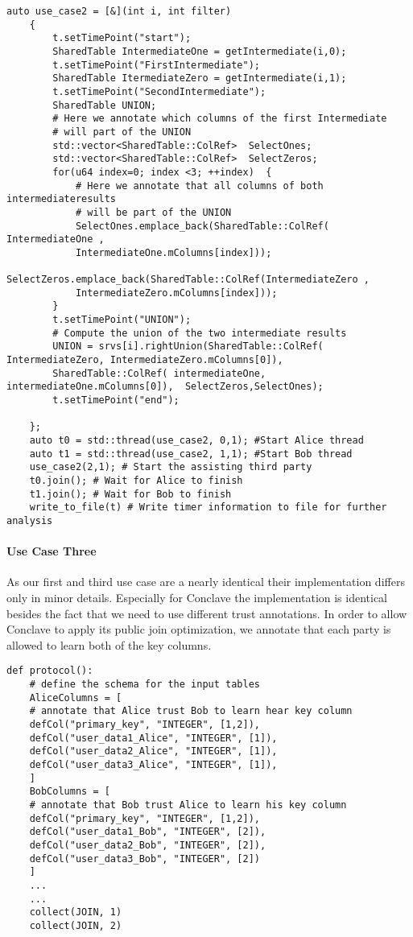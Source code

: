 \label{Listing 5.7}   
\begin{lstlisting}[caption={Simpifiyed Protocol for our second use case in ABY3}]
	auto use_case2 = [&](int i, int filter)
	{
		t.setTimePoint("start"); 
		SharedTable IntermediateOne = getIntermediate(i,0);
		t.setTimePoint("FirstIntermediate"); 
		SharedTable ItermediateZero = getIntermediate(i,1);
		t.setTimePoint("SecondIntermediate");
		SharedTable UNION;
		# Here we annotate which columns of the first Intermediate 
		# will part of the UNION
		std::vector<SharedTable::ColRef>  SelectOnes; 
		std::vector<SharedTable::ColRef>  SelectZeros; 
		for(u64 index=0; index <3; ++index)  {
			# Here we annotate that all columns of both intermediateresults 
			# will be part of the UNION
			SelectOnes.emplace_back(SharedTable::ColRef( IntermediateOne , 
			IntermediateOne.mColumns[index]));
			SelectZeros.emplace_back(SharedTable::ColRef(IntermediateZero , 
			IntermediateZero.mColumns[index]));
		}
		t.setTimePoint("UNION");
		# Compute the union of the two intermediate results
		UNION = srvs[i].rightUnion(SharedTable::ColRef( IntermediateZero, IntermediateZero.mColumns[0]),
		SharedTable::ColRef( intermediateOne, intermediateOne.mColumns[0]),  SelectZeros,SelectOnes);
		t.setTimePoint("end");
		
	};
	auto t0 = std::thread(use_case2, 0,1); #Start Alice thread
	auto t1 = std::thread(use_case2, 1,1); #Start Bob thread
	use_case2(2,1); # Start the assisting third party
	t0.join(); # Wait for Alice to finish
	t1.join(); # Wait for Bob to finish
	write_to_file(t) # Write timer information to file for further analysis
\end{lstlisting}

\paragraph{Use Case Three}
As our first and third use case are a nearly identical their implementation differs only in minor details. Especially for Conclave the implementation is identical besides the fact that we need to use different trust annotations. In order to allow Conclave to apply its public join optimization, we annotate that each party is allowed to learn both of the key columns.

\begin{lstlisting}[caption={ The Python protocol of Conclave for our last use case    }]
	def protocol():
	# define the schema for the input tables 
	AliceColumns = [
	# annotate that Alice trust Bob to learn hear key column
	defCol("primary_key", "INTEGER", [1,2]), 
	defCol("user_data1_Alice", "INTEGER", [1]),
	defCol("user_data2_Alice", "INTEGER", [1]),
	defCol("user_data3_Alice", "INTEGER", [1]),
	]
	BobColumns = [
	# annotate that Bob trust Alice to learn his key column
	defCol("primary_key", "INTEGER", [1,2]),
	defCol("user_data1_Bob", "INTEGER", [2]),
	defCol("user_data2_Bob", "INTEGER", [2]),
	defCol("user_data3_Bob", "INTEGER", [2])
	]
	...
	...
	collect(JOIN, 1)
	collect(JOIN, 2)
\end{lstlisting}




